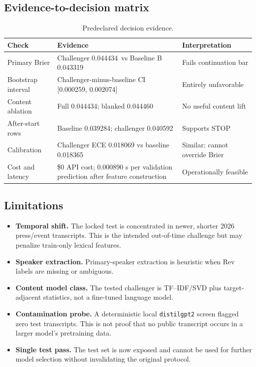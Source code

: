 \documentclass[10pt,a4paper]{article}
\newcommand{\code}[1]{\texttt{\small #1}}
\newcommand{\BaselineBrier}{0.043319}
\newcommand{\ChallengerBrier}{0.044434}
\newcommand{\BlankedBrier}{0.044460}
\newcommand{\DeltaLow}{0.000259}
\newcommand{\DeltaHigh}{0.002074}
\begin{document}
\subsection{Evidence-to-decision matrix}
\begin{table}[H]
  \centering
  \caption{Predeclared decision evidence.}
  \small
  \begin{tabularx}{\textwidth}{@{}L{34mm}Y L{34mm}@{}}
    \toprule
    \textbf{Check} & \textbf{Evidence} & \textbf{Interpretation}\\
    \midrule
    Primary Brier &
      Challenger \ChallengerBrier\ vs Baseline B \BaselineBrier &
      Fails continuation bar\\
    Bootstrap interval &
      Challenger-minus-baseline CI [\DeltaLow, \DeltaHigh] &
      Entirely unfavorable\\
    Content ablation &
      Full \ChallengerBrier; blanked \BlankedBrier &
      No useful content lift\\
    After-start rows &
      Baseline 0.039284; challenger 0.040592 &
      Supports STOP\\
    Calibration &
      Challenger ECE 0.018069 vs baseline 0.018365 &
      Similar; cannot override Brier\\
    Cost and latency &
      \$0 API cost; 0.000890 s per validation prediction after feature construction &
      Operationally feasible\\
    \bottomrule
  \end{tabularx}
\end{table}

\subsection{Limitations}
\begin{itemize}
  \item \textbf{Temporal shift.} The locked test is concentrated in newer, shorter
    2026 press/event transcripts. This is the intended out-of-time challenge but
    may penalize train-only lexical features.
  \item \textbf{Speaker extraction.} Primary-speaker extraction is heuristic when
    Rev labels are missing or ambiguous.
  \item \textbf{Content model class.} The tested challenger is TF--IDF/SVD plus
    target-adjacent statistics, not a fine-tuned language model.
  \item \textbf{Contamination probe.} A deterministic local \code{distilgpt2}
    screen flagged zero test transcripts. This is not proof that no public
    transcript occurs in a larger model's pretraining data.
  \item \textbf{Single test pass.} The test set is now exposed and cannot be used
    for further model selection without invalidating the original protocol.
\end{itemize}
\end{document}
